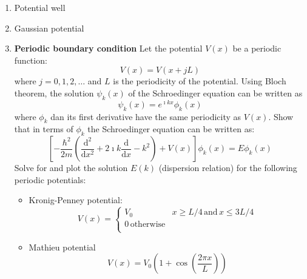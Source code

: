 \begin{enumerate}
%
\item Potential well
%
\item Gaussian potential
%
\item {\sffamily\textbf{Periodic boundary condition}}
  Let the potential $V(x)$ be a periodic function:
  \begin{equation}
  V(x) = V(x + jL)
  \end{equation}
  where $j = 0, 1, 2, \ldots$ and $L$ is the periodicity of the potential.
  Using Bloch theorem, the solution $\psi_{k}(x)$ of the Schroedinger equation
  can be written as
  \begin{equation}
  \psi_{k}(x) = e^{\imath k x} \phi_{k}(x)
  \end{equation}
  where $\phi_{k}$ dan its first derivative have the same periodicity as $V(x)$.
  Show that in terms of $\phi_{k}$ the Schroedinger equation can be written as:
  \begin{equation}
  \left[
  -\frac{\hbar^2}{2m}\left( \frac{\mathrm{d}^2}{\mathrm{d}x^2} +
  2\imath k \frac{\mathrm{d}}{\mathrm{d}x} - k^2
  \right) + V(x) \right] \phi_{k}(x) = E \phi_{k}(x)
  \end{equation}
  Solve for and plot the solution $E(k)$ (dispersion relation) for the following
  periodic potentials:
  \begin{itemize}
  \item Kronig-Penney potential:
  \begin{equation}
  V(x) = \begin{cases}
  V_{0} & x \geq L/4 \, \text{and} \, x \leq 3L/4 \\
  0 \, \text{otherwise} \\
  \end{cases}
  \end{equation}
  \item Mathieu potential
  \begin{equation}
  V(x) = V_{0} \left( 1 + \cos\left(\frac{2\pi x}{L}\right) \right)
  \end{equation}
  \end{itemize}
\end{enumerate}
